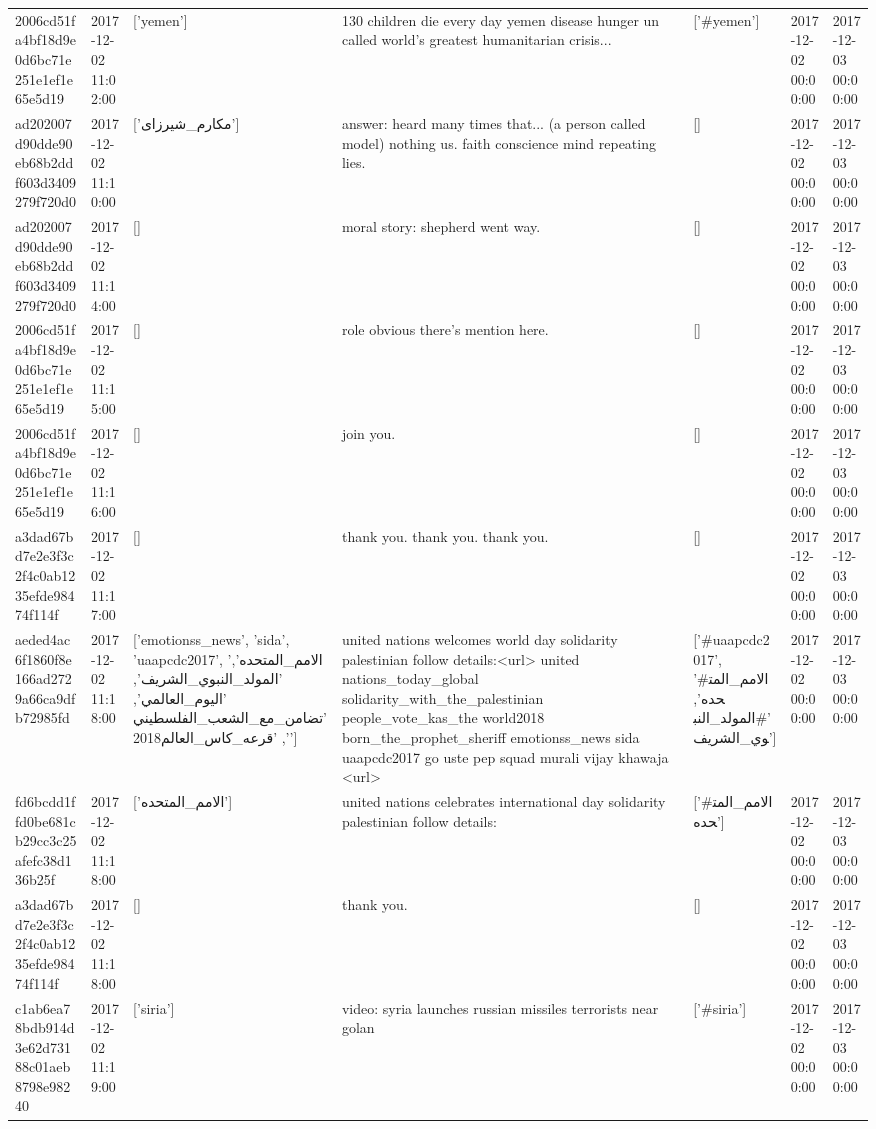 \begin{tabular}{lllllll}
2006cd51fa4bf18d9e0d6bc71e251e1ef1e65e5d19 & 2017-12-02 11:02:00 & ['yemen'] & 130 children die every day yemen disease hunger un called world's greatest humanitarian crisis... & ['#yemen'] & 2017-12-02 00:00:00 & 2017-12-03 00:00:00 \\
ad202007d90dde90eb68b2ddf603d3409279f720d0 & 2017-12-02 11:10:00 & ['مکارم_شیرزای'] & answer: heard many times that... (a person called model) nothing us. faith conscience mind repeating lies. & [] & 2017-12-02 00:00:00 & 2017-12-03 00:00:00 \\
ad202007d90dde90eb68b2ddf603d3409279f720d0 & 2017-12-02 11:14:00 & [] & moral story: shepherd went way. & [] & 2017-12-02 00:00:00 & 2017-12-03 00:00:00 \\
2006cd51fa4bf18d9e0d6bc71e251e1ef1e65e5d19 & 2017-12-02 11:15:00 & [] & role obvious there's mention here. & [] & 2017-12-02 00:00:00 & 2017-12-03 00:00:00 \\
2006cd51fa4bf18d9e0d6bc71e251e1ef1e65e5d19 & 2017-12-02 11:16:00 & [] & join you. & [] & 2017-12-02 00:00:00 & 2017-12-03 00:00:00 \\
a3dad67bd7e2e3f3c2f4c0ab1235efde98474f114f & 2017-12-02 11:17:00 & [] & thank you. thank you. thank you. & [] & 2017-12-02 00:00:00 & 2017-12-03 00:00:00 \\
aeded4ac6f1860f8e166ad2729a66ca9dfb72985fd & 2017-12-02 11:18:00 & ['emotionss_news', 'sida', 'uaapcdc2017', 'الامم_المتحده', 'المولد_النبوي_الشريف', 'اليوم_العالمي', 'تضامن_مع_الشعب_الفلسطيني', 'قرعه_كاس_العالم2018'] & united nations welcomes world day solidarity palestinian follow details:<url> united nations\_today\_global solidarity\_with\_the\_palestinian people\_vote\_kas\_the world2018 born\_the\_prophet\_sheriff emotionss\_news sida uaapcdc2017 go uste pep squad murali vijay khawaja <url> & ['#uaapcdc2017', '#الامم_المتحده', '#المولد_النبوي_الشريف'] & 2017-12-02 00:00:00 & 2017-12-03 00:00:00 \\
fd6bcdd1ffd0be681cb29cc3c25afefc38d136b25f & 2017-12-02 11:18:00 & ['الامم_المتحده'] & united nations celebrates international day solidarity palestinian follow details: & ['#الامم_المتحده'] & 2017-12-02 00:00:00 & 2017-12-03 00:00:00 \\
a3dad67bd7e2e3f3c2f4c0ab1235efde98474f114f & 2017-12-02 11:18:00 & [] & thank you. & [] & 2017-12-02 00:00:00 & 2017-12-03 00:00:00 \\
c1ab6ea78bdb914d3e62d73188c01aeb8798e98240 & 2017-12-02 11:19:00 & ['siria'] & video: syria launches russian missiles terrorists near golan & ['#siria'] & 2017-12-02 00:00:00 & 2017-12-03 00:00:00 \\

\end{tabular}
